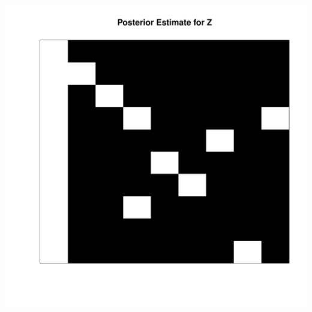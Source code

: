 \beginmyfig
  \vspace{-5mm}
  \caption{}
  \includegraphics{images/postZ.pdf}
  \vspace{-15mm}
\endmyfig

